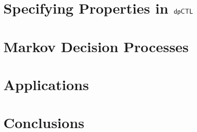 \documentclass{llncs}
\begin{document}
\section{Specifying Properties in $\textsf{dpCTL}$}
\label{section:specifying-properties}


\section{Markov Decision Processes}
\label{section:mdp}


%


\section{Applications}
\label{section:applications}


\section{Conclusions}
\label{section:conclusions}




\end{document}
